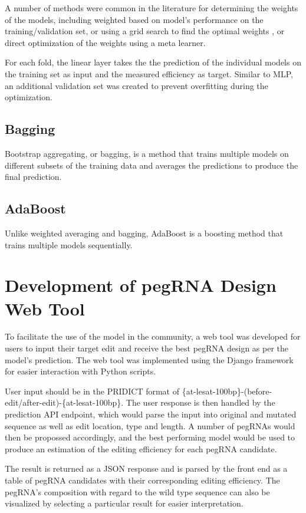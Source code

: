 A number of methods were common in the literature for determining the weights of the models, including weighted based on model's performance on the training/validation set, or using a grid search to find the optimal weights \cite{anandWeightedAverageEnsemble2023}, or direct optimization of the weights using a meta learner.

For each fold, the linear layer takes the the prediction of the individual models on the training set as input and the measured efficiency as target. Similar to MLP, an additional validation set was created to prevent overfitting during the optimization. 

\subsection{Bagging}

Bootstrap aggregating, or bagging, is a method that trains multiple models on different subsets of the training data and averages the predictions to produce the final prediction. 

\subsection{AdaBoost}

Unlike weighted averaging and bagging, AdaBoost is a boosting method that trains multiple models sequentially.

\section{Development of pegRNA Design Web Tool}

To facilitate the use of the model in the community, a web tool was developed for users to input their target edit and receive the best pegRNA design as per the model's prediction. The web tool was implemented using the Django framework for easier interaction with Python scripts. 

User input should be in the PRIDICT format of \{at-lesat-100bp\}-(before-edit/after-edit)-\{at-lesat-100bp\}. The user response is then handled by the prediction API endpoint, which would parse the input into original and mutated sequence as well as edit location, type and length. A number of pegRNAs would then be propossed accordingly, and the best performing model would be used to produce an estimation of the editing efficiency for each pegRNA candidate. 

The result is returned as a JSON response and is parsed by the front end as a table of pegRNA candidates with their corresponding editing efficiency. The pegRNA's composition with regard to the wild type sequence can also be visualized by selecting a particular result for easier interpretation.

